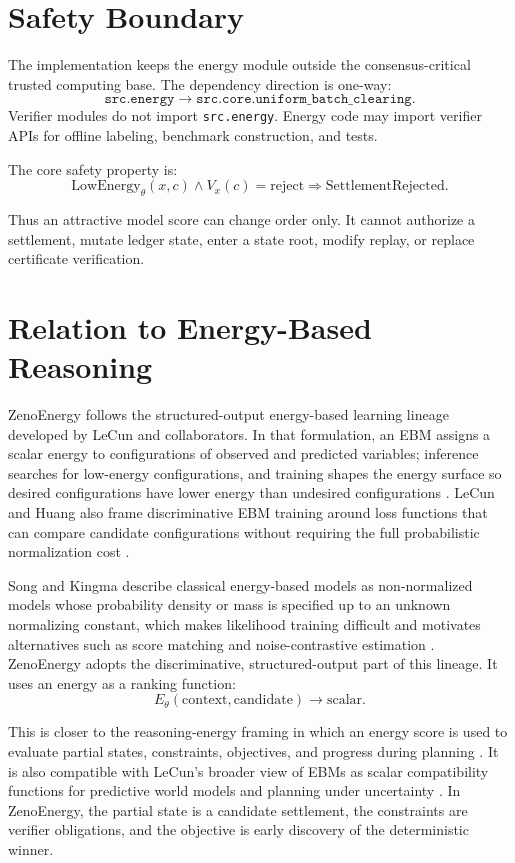 \documentclass[11pt]{article}
\begin{document}
\section{Safety Boundary}

The implementation keeps the energy module outside the consensus-critical
trusted computing base. The dependency direction is one-way:
\[
  \texttt{src.energy} \rightarrow \texttt{src.core.uniform\_batch\_clearing}.
\]
Verifier modules do not import \texttt{src.energy}. Energy code may import
verifier APIs for offline labeling, benchmark construction, and tests.

The core safety property is:
\[
  \mathrm{LowEnergy}_\theta(x,c) \wedge V_x(c)=\mathrm{reject}
  \Rightarrow \mathrm{SettlementRejected}.
\]

Thus an attractive model score can change order only. It cannot authorize a
settlement, mutate ledger state, enter a state root, modify replay, or replace
certificate verification.

\section{Relation to Energy-Based Reasoning}

ZenoEnergy follows the structured-output energy-based learning lineage
developed by LeCun and collaborators. In that formulation, an EBM assigns a
scalar energy to configurations of observed and predicted variables; inference
searches for low-energy configurations, and training shapes the energy surface
so desired configurations have lower energy than undesired configurations
\cite{lecun2006tutorial}. LeCun and Huang also frame discriminative EBM training
around loss functions that can compare candidate configurations without requiring
the full probabilistic normalization cost \cite{lecunhuang2005}.

Song and Kingma describe classical energy-based models as non-normalized models
whose probability density or mass is specified up to an unknown normalizing
constant, which makes likelihood training difficult and motivates alternatives
such as score matching and noise-contrastive estimation \cite{song2021train}.
ZenoEnergy adopts the discriminative, structured-output part of this lineage. It
uses an energy as a ranking function:
\[
  E_\theta(\mathrm{context}, \mathrm{candidate}) \rightarrow \mathrm{scalar}.
\]

This is closer to the reasoning-energy framing in which an energy score is used
to evaluate partial states, constraints, objectives, and progress during
planning \cite{logical2026ebrm}. It is also compatible with LeCun's broader
view of EBMs as scalar compatibility functions for predictive world models and
planning under uncertainty \cite{lecun2022path}. In ZenoEnergy, the partial
state is a candidate settlement, the constraints are verifier obligations, and
the objective is early discovery of the deterministic winner.
\end{document}
